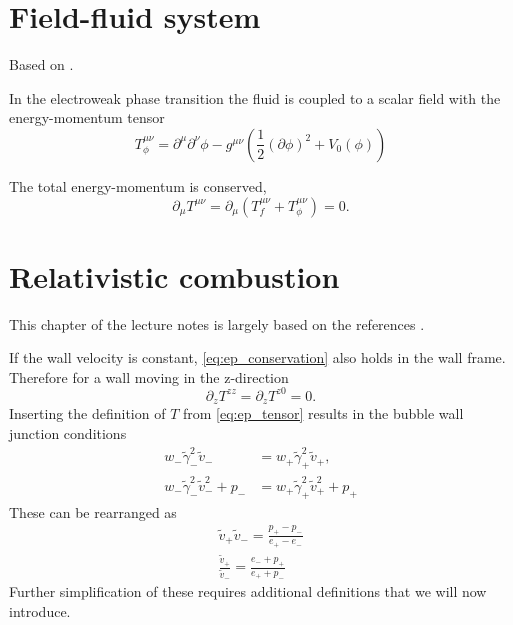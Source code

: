 \section{Field-fluid system}
Based on \cite{moore_pt_1995}.

In the electroweak phase transition the fluid is coupled to a scalar field with the energy-momentum tensor
\cites[eq. 2.9]{hindmarsh_gw_pt_2019}
\begin{equation}
T_\phi^{\mu \nu}
= \partial^\mu \partial^\nu \phi
- g^{\mu \nu} \left(\frac{1}{2} (\partial \phi)^2 + V_0 (\phi) \right)
\end{equation}

The total energy-momentum is conserved,
\cite[eq. 5.17]{lecture_notes}
\begin{equation}
\partial_\mu T^{\mu \nu} = \partial_\mu (T_f^{\mu \nu} + T_\phi^{\mu \nu}) = 0.
\end{equation}



\section{Relativistic combustion}
This chapter of the lecture notes is largely based on the references
\cites{hindmarsh_gw_pt_2019}{espinosa_energy_2010}.

If the wall velocity is constant, \eqref{eq:ep_conservation} also holds in the wall frame.
Therefore for a wall moving in the z-direction
\cite[eq. 7]{espinosa_energy_2010}
\begin{equation}
\partial_z T^{zz} = \partial_z T^{z0} = 0.
\end{equation}
Inserting the definition of $T$ from \eqref{eq:ep_tensor} results in the bubble wall junction conditions
\cites[eq. 7.22]{lecture_notes}[eq. B.2-3]{hindmarsh_gw_pt_2019}
\begin{align}
w_- \tilde{\gamma}_-^2 \tilde{v}_- &= w_+ \tilde{\gamma}_+^2 \tilde{v}_+, \\
w_- \tilde{\gamma}_-^2 \tilde{v}_-^2 + p_- &= w_+ \tilde{\gamma}_+^2 \tilde{v}_+^2 + p_+
\end{align}
These can be rearranged as
\cites[eq. 7.32]{lecture_notes}[eq. 6-7]{giese_2020}
\begin{align}
\tilde{v}_+ \tilde{v}_- = \frac{p_+ - p_-}{e_+ - e_-} \\
\frac{\tilde{v}_+}{\tilde{v}_-} = \frac{e_- + p_+}{e_+ + p_-}
\label{eq:junction_ep}
\end{align}
Further simplification of these requires additional definitions
that we will now introduce.

